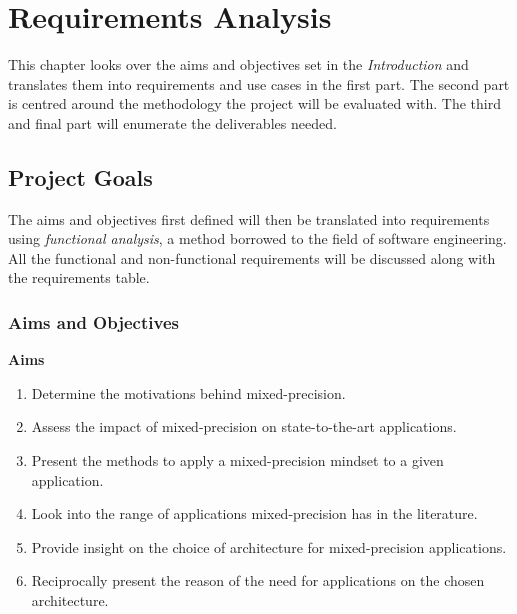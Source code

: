 \chapter{Requirements Analysis} %

\label{Chapter3} %



This chapter looks over the aims and objectives set in the \emph{Introduction} and translates them into requirements and use cases in the first part. The second part is centred around the methodology the project will be evaluated with. The third and final part will enumerate the deliverables needed.

\section{Project Goals}

The aims and objectives first defined will then be translated into requirements using \emph{functional analysis}, a method borrowed to the field of software engineering. All the functional and non-functional requirements will be discussed along with the requirements table.


\subsection{Aims and Objectives}

\textbf{Aims}

\begin{enumerate}
  \item Determine the motivations behind mixed-precision.
  \item Assess the impact of mixed-precision on state-to-the-art applications.
  \item Present the methods to apply a mixed-precision mindset to a given application.
  \item Look into the range of applications mixed-precision has in the literature.
  \item Provide insight on the choice of architecture for mixed-precision applications.
  \item Reciprocally present the reason of the need for applications on the chosen architecture.
\end{enumerate}

